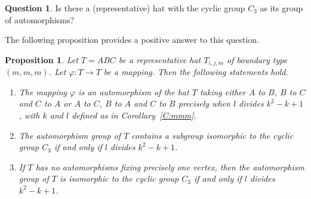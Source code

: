 \documentclass[12pt]{amsart}
\def\p{\varphi}
\theoremstyle{plain}
\newtheorem{proposition}[theorem]{Proposition}
\theoremstyle{definition}
\newtheorem{question}[theorem]{Question}
\numberwithin{equation}{section}
\begin{document}
\begin{question}
Is there a (representative) hat with the cyclic group $C_3$ as its group of automorphisms?
\end{question}


The following proposition provides a positive answer to this question.


\begin{proposition}\label{P:mmm}
Let $T = ABC$ be a representative hat $T_{i,j,m}$ of boundary type $(m,m,m)$. Let $\p: T
\rightarrow T$ be a mapping. Then the following statements hold.
\begin{enumerate}
\item[(a)] The mapping $\p$ is an automorphism of the hat $T$ taking either $A$ to $B$, $B$ to $C$ and $C$ to $A$ or $A$ to $C$, $B$ to $A$ and $C$ to $B$ precisely when $l$ divides $k^2 - k + 1$, with $k$ and $l$ defined as in Corollary~\ref{C:mmm}.
\item[(b)] The automorphism group of $T$ contains a subgroup isomorphic to the cyclic group
    $C_3$ if and only if $l$ divides $k^2 - k + 1$.
\item[(c)] If $T$ has no automorphisms fixing precisely one vertex, then the automorphism
    group of $T$ is isomorphic to the cyclic group $C_3$ if and only if $l$ divides $k^2 - k + 1$.
\end{enumerate}
\end{proposition}
\end{document}
